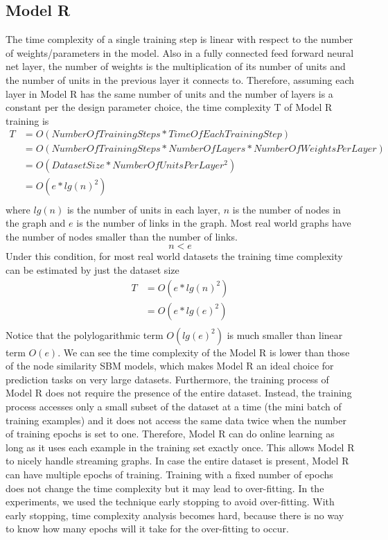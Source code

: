\documentclass[12pt]{WSUThesis}
\theoremstyle{definition}
\begin{document}
\subsection{Model R}
The time complexity of a single training step is linear with respect to the number of weights/parameters in the model.
Also in a fully connected feed forward neural net layer, the number of weights is the multiplication of its number of units and the number of units in the previous layer it connects to.
Therefore, assuming each layer in Model R has the same number of units and the number of layers is a constant per the design parameter choice,
the time complexity T of Model R training is
\begin{align*}
	T
	&= O(NumberOfTrainingSteps * TimeOfEachTrainingStep) \\
	&= O(NumberOfTrainingSteps * NumberOfLayers * NumberOfWeightsPerLayer) \\
	&= O(DatasetSize * NumberOfUnitsPerLayer^2) \\
	&= O(e * lg(n)^2) \\
\end{align*}
where $ lg(n) $ is the number of units in each layer, $ n $ is the number of nodes in the graph and $ e $ is the number of links in the graph.
Most real world graphs have the number of nodes smaller than the number of links.
\[ n < e\]
Under this condition, for most real world datasets the training time complexity can be estimated by just the dataset size
\begin{align*}
	T
	&= O(e * lg(n)^2) \\
	&= O(e * lg(e)^2) \\
\end{align*}
Notice that the polylogarithmic term $ O(lg(e)^2) $ is much smaller than linear term $ O(e) $.
We can see the time complexity of the Model R is lower than those of the node similarity SBM models, which makes Model R an ideal choice for prediction tasks on very large datasets.
Furthermore, the training process of Model R does not require the presence of the entire dataset.
Instead, the training process accesses only a small subset of the dataset at a time (the mini batch of training examples) and it does not access the same data twice when the number of training epochs is set to one.
Therefore, Model R can do online learning as long as it uses each example in the training set exactly once.
This allows Model R to nicely handle streaming graphs.
In case the entire dataset is present, Model R can have multiple epochs of training.
Training with a fixed number of epochs does not change the time complexity but it may lead to over-fitting.
In the experiments, we used the technique early stopping to avoid over-fitting.
With early stopping, time complexity analysis becomes hard, because there is no way to know how many epochs will it take for the over-fitting to occur.
\end{document}

